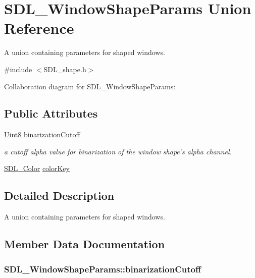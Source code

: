 \hypertarget{union_s_d_l___window_shape_params}{\section{S\-D\-L\-\_\-\-Window\-Shape\-Params Union Reference}
\label{union_s_d_l___window_shape_params}
}


A union containing parameters for shaped windows.  




{\ttfamily \#include $<$S\-D\-L\-\_\-shape.\-h$>$}



Collaboration diagram for S\-D\-L\-\_\-\-Window\-Shape\-Params\-:
\subsection*{Public Attributes}
\begin{DoxyCompactItemize}
\item 
\hyperlink{_s_d_l__stdinc_8h_a2944638813a090aa23e62f4da842c3e2}{Uint8} \hyperlink{union_s_d_l___window_shape_params_a534c40b09588a8075c0a70227753dc56}{binarization\-Cutoff}
\begin{DoxyCompactList}\small\item\em a cutoff alpha value for binarization of the window shape's alpha channel. \end{DoxyCompactList}\item 
\hyperlink{struct_s_d_l___color}{S\-D\-L\-\_\-\-Color} \hyperlink{union_s_d_l___window_shape_params_a8bf3e442a51a1bbf452cfec7c1ed5318}{color\-Key}
\end{DoxyCompactItemize}


\subsection{Detailed Description}
A union containing parameters for shaped windows. 

\subsection{Member Data Documentation}
\hypertarget{union_s_d_l___window_shape_params_a534c40b09588a8075c0a70227753dc56}{
\subsubsection[{binarization\-Cutoff}]{ S\-D\-L\-\_\-\-Window\-Shape\-Params\-::binarization\-Cutoff}}\label{union_s_d_l___window_shape_params_a534c40b09588a8075c0a70227753dc56}


